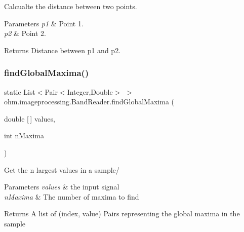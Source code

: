 Calcualte the distance between two points. 
\begin{DoxyParams}{Parameters}
{\em p1} & Point 1. \\
\hline
{\em p2} & Point 2. \\
\hline
\end{DoxyParams}
\begin{DoxyReturn}{Returns}
Distance between p1 and p2. 
\end{DoxyReturn}
\hypertarget{classohm_1_1imageprocessing_1_1_band_reader_ac5c3bd6e24700bc9bcf8d882c044d1b6}{}\label{classohm_1_1imageprocessing_1_1_band_reader_ac5c3bd6e24700bc9bcf8d882c044d1b6} 
\subsubsection{\texorpdfstring{find\+Global\+Maxima()}{findGlobalMaxima()}}
{\footnotesize\ttfamily static List$<$Pair$<$Integer,Double$>$ $>$ ohm.\+imageprocessing.\+Band\+Reader.\+find\+Global\+Maxima (\begin{DoxyParamCaption}\item[{double \mbox{[}$\,$\mbox{]}}]{values,  }\item[{int}]{n\+Maxima }\end{DoxyParamCaption})\hspace{0.3cm}{\ttfamily [static]}}

Get the n largest values in a sample/ 
\begin{DoxyParams}{Parameters}
{\em values} & the input signal \\
\hline
{\em n\+Maxima} & The number of maxima to find \\
\hline
\end{DoxyParams}
\begin{DoxyReturn}{Returns}
A list of (index, value) Pairs representing the global maxima in the sample 
\end{DoxyReturn}
\hypertarget{classohm_1_1imageprocessing_1_1_band_reader_a14e650d56c1f86b422eb2897ed359ade}{}\label{classohm_1_1imageprocessing_1_1_band_reader_a14e650d56c1f86b422eb2897ed359ade} 
